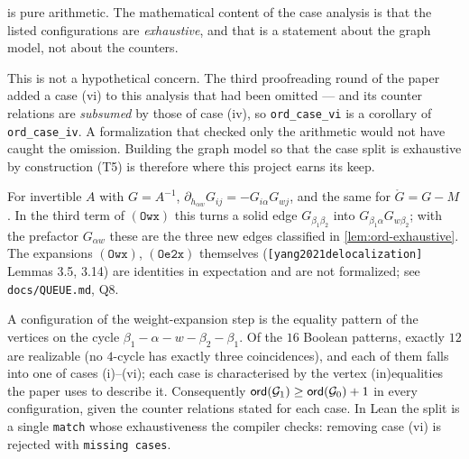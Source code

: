 \begin{remark}\label{rem:ord-exhaustive}
   is pure arithmetic.  The mathematical content of the case analysis
  is that the listed configurations are \emph{exhaustive}, and that is a statement about
  the graph model, not about the counters.

  This is not a hypothetical concern.  The third proofreading round of the paper added a
  case (vi) to this analysis that had been omitted --- and its counter relations are
  \emph{subsumed} by those of case (iv), so \texttt{ord\_case\_vi} is a corollary of
  \texttt{ord\_case\_iv}.  A formalization that checked only the arithmetic would not have
  caught the omission.  Building the graph model so that the case split is exhaustive by
  construction (T5) is therefore where this project earns its keep.
\end{remark}

\begin{lemma}\label{lem:dG}
  \leanok
  For invertible $A$ with $G=A^{-1}$, $\partial_{h_{\alpha w}}G_{ij}=-G_{i\alpha}G_{wj}$, and the same for
  $\mathring G=G-M$.  In the third term of $\mathtt{(Owx)}$ this turns a solid edge $G_{\beta_1\beta_2}$
  into $G_{\beta_1\alpha}G_{w\beta_2}$; with the prefactor $G_{\alpha w}$ these are the three new
  edges classified in \cref{lem:ord-exhaustive}.  The expansions $\mathtt{(Owx)}$, $\mathtt{(Oe2x)}$
  themselves (\texttt{[yang2021delocalization]} Lemmas 3.5, 3.14) are identities in expectation
  and are not formalized; see \texttt{docs/QUEUE.md}, Q8.
\end{lemma}

\begin{lemma}\label{lem:ord-exhaustive}
  \leanok
  A configuration of the weight-expansion step is the equality pattern of the vertices on
  the cycle $\beta_1 - \alpha - w - \beta_2 - \beta_1$.  Of the $16$ Boolean patterns, exactly
  $12$ are realizable (no $4$-cycle has exactly three coincidences), and each of them falls
  into one of cases (i)--(vi); each case is characterised by the vertex (in)equalities the
  paper uses to describe it.  Consequently $\mathsf{ord}(\mathcal G_1) \ge \mathsf{ord}(\mathcal G_0)+1$ in
  every configuration, given the counter relations stated for each case.  In Lean the split
  is a single \texttt{match} whose exhaustiveness the compiler checks: removing case (vi)
  is rejected with \texttt{missing cases}.
\end{lemma}


